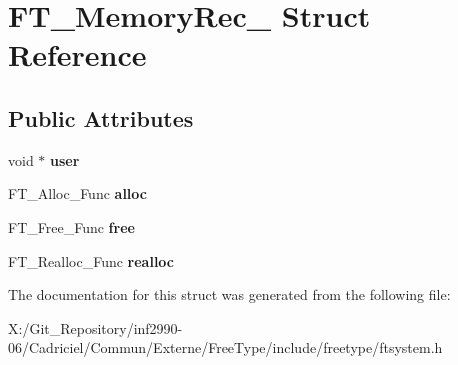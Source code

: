 \hypertarget{struct_f_t___memory_rec__}{\section{F\-T\-\_\-\-Memory\-Rec\-\_\- Struct Reference}
\label{struct_f_t___memory_rec__}
}
\subsection*{Public Attributes}
\begin{DoxyCompactItemize}
\item 
\hypertarget{struct_f_t___memory_rec___aae5bc614434ba4525e37d7faaf03c4b7}{void $\ast$ {\bfseries user}}\label{struct_f_t___memory_rec___aae5bc614434ba4525e37d7faaf03c4b7}

\item 
\hypertarget{struct_f_t___memory_rec___a2269eada6afbb008fe5c73707145410c}{F\-T\-\_\-\-Alloc\-\_\-\-Func {\bfseries alloc}}\label{struct_f_t___memory_rec___a2269eada6afbb008fe5c73707145410c}

\item 
\hypertarget{struct_f_t___memory_rec___a83ab2422bd9265d8731b9e5e368ba240}{F\-T\-\_\-\-Free\-\_\-\-Func {\bfseries free}}\label{struct_f_t___memory_rec___a83ab2422bd9265d8731b9e5e368ba240}

\item 
\hypertarget{struct_f_t___memory_rec___a5ce3424cc72e898fe973ffeabe44a95c}{F\-T\-\_\-\-Realloc\-\_\-\-Func {\bfseries realloc}}\label{struct_f_t___memory_rec___a5ce3424cc72e898fe973ffeabe44a95c}

\end{DoxyCompactItemize}


The documentation for this struct was generated from the following file\-:\begin{DoxyCompactItemize}
\item 
X\-:/\-Git\-\_\-\-Repository/inf2990-\/06/\-Cadriciel/\-Commun/\-Externe/\-Free\-Type/include/freetype/ftsystem.\-h\end{DoxyCompactItemize}

